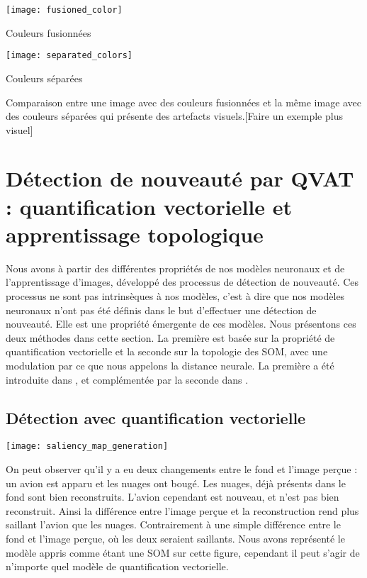 	\begin{figureth}
		\begin{subfigureth}{0.48\textwidth}
			\texttt{[image: fusioned\_color]}\caption{Couleurs fusionnées}	
		\end{subfigureth}
		\begin{subfigureth}{0.48\textwidth}
			\texttt{[image: separated\_colors]}\caption{Couleurs séparées}	
		\end{subfigureth}
		\caption[Représentation d'une image]{Comparaison entre une image avec des couleurs fusionnées et la même image avec des couleurs séparées qui présente des artefacts visuels.[Faire un exemple plus visuel]}\label{fig:img:rep}
	\end{figureth}

	\newpage
	\section{Détection de nouveauté par QVAT : quantification vectorielle et apprentissage topologique}

	Nous avons à partir des différentes propriétés de nos modèles neuronaux et de l'apprentissage d'images, développé des processus de détection de nouveauté. Ces processus ne sont pas intrinsèques à nos modèles, c'est à dire que nos modèles neuronaux n'ont pas été définis dans le but d'effectuer une détection de nouveauté. Elle est une propriété émergente de ces modèles. Nous présentons ces deux méthodes dans cette section. La première est basée sur la propriété de quantification vectorielle et la seconde sur la topologie des SOM, avec une modulation par ce que nous appelons la distance neurale. La première a été introduite dans \cite{bernard2019novelty}, et complémentée par la seconde dans \cite{bernard2020novelty}.

	\subsection{Détection avec quantification vectorielle}

	\begin{figureth}
		\texttt{[image: saliency\_map\_generation]}
		\caption[Détection de nouveauté par quantification vectorielle]{On peut observer qu'il y a eu deux changements entre le fond et l'image perçue : un avion est apparu et les nuages ont bougé. Les nuages, déjà présents dans le fond sont bien reconstruits. L'avion cependant est nouveau, et n'est pas bien reconstruit. Ainsi la différence entre l'image perçue et la reconstruction rend plus saillant l'avion que les nuages. Contrairement à une simple différence entre le fond et l'image perçue, où les deux seraient saillants. Nous avons représenté le modèle appris comme étant une SOM sur cette figure, cependant il peut s'agir de n'importe quel modèle de quantification vectorielle.}\label{fig:img:vq}
	\end{figureth}

